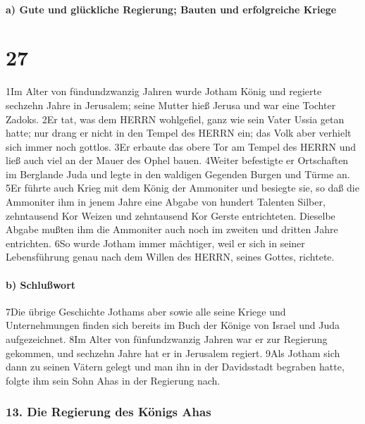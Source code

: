 \hypertarget{a-gute-und-gluxfcckliche-regierung-bauten-und-erfolgreiche-kriege}{%
\paragraph{a) Gute und glückliche Regierung; Bauten und erfolgreiche
Kriege}\label{a-gute-und-gluxfcckliche-regierung-bauten-und-erfolgreiche-kriege}}

\hypertarget{section-26}{%
\section{27}\label{section-26}}

1Im Alter von fündundzwanzig Jahren wurde Jotham König und regierte
sechzehn Jahre in Jerusalem; seine Mutter hieß Jerusa und war eine
Tochter Zadoks. 2Er tat, was dem HERRN wohlgefiel, ganz wie sein Vater
Ussia getan hatte; nur drang er nicht in den Tempel des HERRN ein; das
Volk aber verhielt sich immer noch gottlos. 3Er erbaute das obere Tor am
Tempel des HERRN und ließ auch viel an der Mauer des Ophel bauen.
4Weiter befestigte er Ortschaften im Berglande Juda und legte in den
waldigen Gegenden Burgen und Türme an. 5Er führte auch Krieg mit dem
König der Ammoniter und besiegte sie, so daß die Ammoniter ihm in jenem
Jahre eine Abgabe von hundert Talenten Silber, zehntausend Kor Weizen
und zehntausend Kor Gerste entrichteten. Dieselbe Abgabe mußten ihm die
Ammoniter auch noch im zweiten und dritten Jahre entrichten. 6So wurde
Jotham immer mächtiger, weil er sich in seiner Lebensführung genau nach
dem Willen des HERRN, seines Gottes, richtete.

\hypertarget{b-schluuxdfwort}{%
\paragraph{b) Schlußwort}\label{b-schluuxdfwort}}

7Die übrige Geschichte Jothams aber sowie alle seine Kriege und
Unternehmungen finden sich bereits im Buch der Könige von Israel und
Juda aufgezeichnet. 8Im Alter von fünfundzwanzig Jahren war er zur
Regierung gekommen, und sechzehn Jahre hat er in Jerusalem regiert. 9Als
Jotham sich dann zu seinen Vätern gelegt und man ihn in der Davidsstadt
begraben hatte, folgte ihm sein Sohn Ahas in der Regierung nach.

\hypertarget{die-regierung-des-kuxf6nigs-ahas}{%
\subsubsection{13. Die Regierung des Königs
Ahas}\label{die-regierung-des-kuxf6nigs-ahas}}

